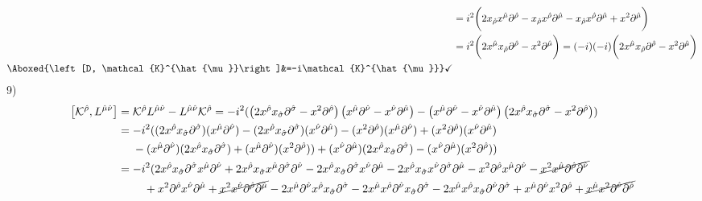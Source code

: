 \documentclass[]{article}
\numberwithin{equation}{section}
\begin{document}
\begin{align}
    &=i^2\bigg(2x_{\hat{\rho}}x^{\hat{\mu}}\partial^{\hat{\rho}}-x_{\hat{\rho}}x^{\hat{\rho}}\partial^{\hat{\mu}}-x_{\hat{\rho}}x^{\hat{\rho}}\partial^{\hat{\mu}}+x^2\partial^{\hat{\mu}}\bigg)\\
    &=i^2\bigg(2x^{\hat{\mu}}x_{\hat{\rho}}\partial^{\hat{\rho}}-x^2\partial^{\hat{\mu}}\bigg)=(-i)(-i)\bigg(2x^{\hat{\mu}}x_{\hat{\rho}}\partial^{\hat{\rho}}-x^2\partial^{\hat{\mu}}\bigg)\\
    \Aboxed{\left[D, \mathcal{K}^{\hat{\mu}}\right]&=-i\mathcal{K}^{\hat{\mu}}}\checkmark
\end{align}
9)
\begin{align}
    \left[\mathcal{K}^{\hat{\rho}},L^{\hat{\mu}\hat{\nu}}\right]&=\mathcal{K}^{\hat{\rho}}L^{\hat{\mu}\hat{\nu}}-L^{\hat{\mu}\hat{\nu}}\mathcal{K}^{\hat{\rho}}=-i^2(\left(2x^{\hat{\rho}}x_{\hat{\sigma}}\partial^{\hat{\sigma}}-x^2\partial^{\hat{\rho}}\right)\left(x^{\hat{\mu}}\partial^{\hat{\nu}}-x^{\hat{\nu}}\partial^{\hat{\mu}}\right)-\left(x^{\hat{\mu}}\partial^{\hat{\nu}}-x^{\hat{\nu}}\partial^{\hat{\mu}}\right)\left(2x^{\hat{\rho}}x_{\hat{\sigma}}\partial^{\hat{\sigma}}-x^2\partial^{\hat{\rho}}\right))\\
    &=-i^2((2x^{\hat{\rho}}x_{\hat{\sigma}}\partial^{\hat{\sigma}})(x^{\hat{\mu}}\partial^{\hat{\nu}})-(2x^{\hat{\rho}}x_{\hat{\sigma}}\partial^{\hat{\sigma}})(x^{\hat{\nu}}\partial^{\hat{\mu}})-(x^2\partial^{\hat{\rho}})(x^{\hat{\mu}}\partial^{\hat{\nu}})+(x^2\partial^{\hat{\rho}})(x^{\hat{\nu}}\partial^{\hat{\mu}})\nonumber\\
    &~~~~-(x^{\hat{\mu}}\partial^{\hat{\nu}})(2x^{\hat{\rho}}x_{\hat{\sigma}}\partial^{\hat{\sigma}})+(x^{\hat{\mu}}\partial^{\hat{\nu}})(x^2\partial^{\hat{\rho}}))+(x^{\hat{\nu}}\partial^{\hat{\mu}})(2x^{\hat{\rho}}x_{\hat{\sigma}}\partial^{\hat{\sigma}})-(x^{\hat{\nu}}\partial^{\hat{\mu}})(x^2\partial^{\hat{\rho}}))\\
    &=-i^2(2x^{\hat{\rho}}x_{\hat{\sigma}}\partial^{\hat{\sigma}}x^{\hat{\mu}}\partial^{\hat{\nu}}+2x^{\hat{\rho}}x_{\hat{\sigma}}x^{\hat{\mu}}\partial^{\hat{\sigma}}\partial^{\hat{\nu}}-2x^{\hat{\rho}}x_{\hat{\sigma}}\partial^{\hat{\sigma}}x^{\hat{\nu}}\partial^{\hat{\mu}}-2x^{\hat{\rho}}x_{\hat{\sigma}}x^{\hat{\nu}}\partial^{\hat{\sigma}}\partial^{\hat{\mu}}-x^2\partial^{\hat{\rho}}x^{\hat{\mu}}\partial^{\hat{\nu}}-\cancel{x^2x^{\hat{\mu}}\partial^{\hat{\rho}}\partial^{\hat{\nu}}}\nonumber\\
    &~~~~~~~+x^2\partial^{\hat{\rho}}x^{\hat{\nu}}\partial^{\hat{\mu}}+\cancel{x^2x^{\hat{\nu}}\partial^{\hat{\rho}}\partial^{\hat{\mu}}}-2x^{\hat{\mu}}\partial^{\hat{\nu}}x^{\hat{\rho}}x_{\hat{\sigma}}\partial^{\hat{\sigma}}-2x^{\hat{\mu}}x^{\hat{\rho}}\partial^{\hat{\nu}}x_{\hat{\sigma}}\partial^{\hat{\sigma}}-2x^{\hat{\mu}}x^{\hat{\rho}}x_{\hat{\sigma}}\partial^{\hat{\nu}}\partial^{\hat{\sigma}}+x^{\hat{\mu}}\partial^{\hat{\nu}}x^2\partial^{\hat{\rho}}+\cancel{x^{\hat{\mu}}x^2\partial^{\hat{\nu}}\partial^{\hat{\rho}}}\nonumber\\

\end{align}
\end{document}
